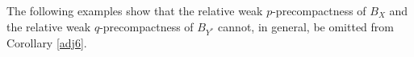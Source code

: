\documentclass[12 pt]{article}%
\newtheorem{final remark}[theorem]{Final Remark}
\newcommand {\N} {\mathbb{N}}
\newcommand{\norma}[1]{\| #1 \|}
\begin{document}


The following examples show that the relative weak $p$-precompactness of $B_X$ and the relative weak $q$-precompactness of $B_{Y^*}$ cannot, in general, be omitted from Corollary \ref{adj6}.
\end{document}
